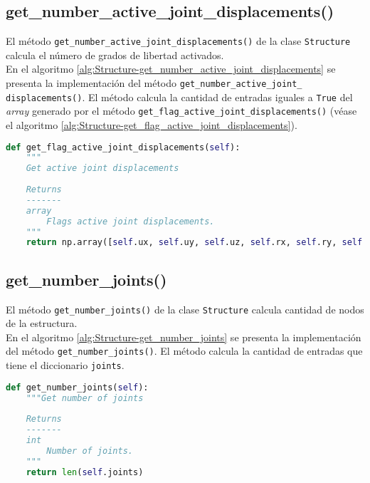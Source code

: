 \subsection{get\_number\_active\_joint\_displacements()}

El método \verb|get_number_active_joint_displacements()| de la clase \verb|Structure| calcula el número de grados de libertad activados.\\

En el algoritmo \ref{alg:Structure-get_number_active_joint_displacements} se presenta la implementación del método \verb|get_number_active_joint_| \verb|displacements()|. El método calcula la cantidad de entradas iguales a \verb|True| del \emph{array} generado por el método \verb|get_flag_active_joint_displacements()| (véase el algoritmo \ref{alg:Structure-get_flag_active_joint_displacements}).\\

\begin{lstlisting}[language=Python,caption=Método \texttt{get\_number\_active\_joint\_displacements()} de la clase \texttt{Struc} \texttt{ture}.,label=alg:Structure-get_number_active_joint_displacements, frame=single]
def get_flag_active_joint_displacements(self):
    """
    Get active joint displacements
    
    Returns
    -------
    array
        Flags active joint displacements.
    """
    return np.array([self.ux, self.uy, self.uz, self.rx, self.ry, self.rz])
\end{lstlisting}

\subsection{get\_number\_joints()}
El método \verb|get_number_joints()| de la clase \verb|Structure| calcula cantidad de nodos de la estructura.\\

En el algoritmo \ref{alg:Structure-get_number_joints} se presenta la implementación del método \verb|get_number_joints()|. El método calcula la cantidad de entradas que tiene el diccionario \verb|joints|.\\

\begin{lstlisting}[language=Python,caption=Método \texttt{get\_number\_joints()} de la clase \texttt{Structure}.,label=alg:Structure-get_number_joints, frame=single]
def get_number_joints(self):
    """Get number of joints
    
    Returns
    -------
    int
        Number of joints.
    """
    return len(self.joints)
\end{lstlisting}

